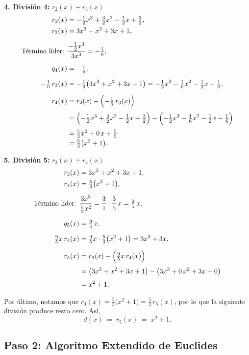 \documentclass[12pt]{article}
\begin{document}
\noindent\textbf{4. División 4:} \(r_2(x) \div r_3(x)\)
\begin{align*}
  r_2(x) &= -\tfrac12 x^3 + \tfrac32 x^2 - \tfrac12 x + \tfrac32, \\
  r_3(x) &= 3x^3 + x^2 + 3x + 1, \\[6pt]
  \text{Término líder: }&\dfrac{-\tfrac12 x^3}{3x^3} = -\tfrac{1}{6}, \\[6pt]
  q_4(x) &= -\tfrac{1}{6}, \\[6pt]
  -\tfrac{1}{6}\,r_3(x) &= -\tfrac{1}{6}\bigl(3x^3 + x^2 + 3x + 1\bigr)
                    = -\tfrac12 x^3 - \tfrac{1}{6} x^2 - \tfrac12 x - \tfrac{1}{6}, \\[6pt]
  r_4(x) &= r_2(x) - \Bigl(-\tfrac{1}{6}\,r_3(x)\Bigr) \\[3pt]
         &= \Bigl(-\tfrac12 x^3 + \tfrac32 x^2 - \tfrac12 x + \tfrac32\Bigr)
            - \Bigl(-\tfrac12 x^3 - \tfrac{1}{6} x^2 - \tfrac12 x - \tfrac{1}{6}\Bigr) \\[3pt]
         &= \tfrac53 x^2 + 0\,x + \tfrac53 \\[-2pt]
         &= \tfrac{5}{3}\bigl(x^2 + 1\bigr).
\end{align*}

\noindent\textbf{5. División 5:} \(r_3(x) \div r_4(x)\)
\begin{align*}
  r_3(x) &= 3x^3 + x^2 + 3x + 1, \\
  r_4(x) &= \tfrac{5}{3}\bigl(x^2 + 1\bigr), \\[6pt]
  \text{Término líder: }&\dfrac{3x^3}{\tfrac{5}{3}x^2} = \dfrac{3}{1} \cdot \dfrac{3}{5} \,x = \tfrac{9}{5} \,x, \\[6pt]
  q_5(x) &= \tfrac{9}{5} \,x, \\[6pt]
  \tfrac{9}{5}x\,r_4(x) &= \tfrac{9}{5}x\cdot \tfrac{5}{3}\bigl(x^2 + 1\bigr)
                   = 3x^3 + 3x, \\[6pt]
  r_5(x) &= r_3(x) - \Bigl(\tfrac{9}{5}x\,r_4(x)\Bigr) \\[3pt]
         &= \bigl(3x^3 + x^2 + 3x + 1\bigr)
            - \bigl(3x^3 + 0\,x^2 + 3x + 0\bigr) \\[3pt]
         &= x^2 + 1.
\end{align*}

Por último, notamos que
\(r_4(x) = \tfrac{5}{3}\bigl(x^2 + 1\bigr) = \tfrac{5}{3}\,r_5(x)\),
por lo que la siguiente división produce resto cero. Así,
\[
  d(x) \;=\; r_5(x) \;=\; x^2 + 1.
\]

\subsection*{Paso 2: Algoritmo Extendido de Euclides}
\end{document}
